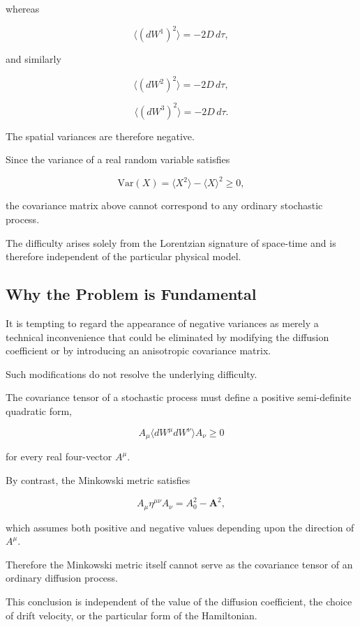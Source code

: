 whereas

\[
\langle
(dW^1)^2
\rangle
=
-2D\,d\tau ,
\]

and similarly

\[
\langle
(dW^2)^2
\rangle
=
-2D\,d\tau ,
\]

\[
\langle
(dW^3)^2
\rangle
=
-2D\,d\tau .
\]

The spatial variances are therefore negative.

Since the variance of a real random variable satisfies

\[
\mathrm{Var}(X)
=
\langle X^2\rangle
-
\langle X\rangle^2
\ge 0 ,
\]

the covariance matrix above cannot correspond to any ordinary stochastic
process.

The difficulty arises solely from the Lorentzian signature of space-time
and is therefore independent of the particular physical model.

\subsection{Why the Problem is Fundamental}

It is tempting to regard the appearance of negative variances as merely
a technical inconvenience that could be eliminated by modifying the
diffusion coefficient or by introducing an anisotropic covariance
matrix.

Such modifications do not resolve the underlying difficulty.

The covariance tensor of a stochastic process must define a positive
semi-definite quadratic form,

\[
A_\mu
\langle
dW^\mu dW^\nu
\rangle
A_\nu
\ge
0
\]

for every real four-vector \(A^\mu\).

By contrast, the Minkowski metric satisfies

\[
A_\mu
\eta^{\mu\nu}
A_\nu
=
A_0^2
-
\mathbf{A}^2 ,
\]

which assumes both positive and negative values depending upon the
direction of \(A^\mu\).

Therefore the Minkowski metric itself cannot serve as the covariance
tensor of an ordinary diffusion process.

This conclusion is independent of the value of the diffusion
coefficient, the choice of drift velocity, or the particular form of the
Hamiltonian.

